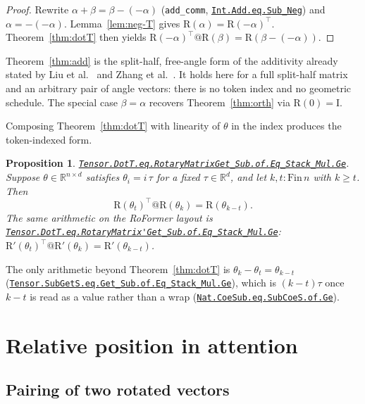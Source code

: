 \documentclass[11pt,a4paper]{article}
\newcommand{\lmod}[1]{\href{http://www.lemma.cn/lean/?module=#1}{\nolinkurl{#1}}}
\newtheorem{proposition}[theorem]{Proposition}
\newcommand{\R}{\mathbb{R}}
\newcommand{\rot}{\mathrm{R}}
\newcommand{\eye}{\mathrm{I}}
\begin{document}
\begin{proof}
Rewrite \(\alpha+\beta=\beta-(-\alpha)\)
(\texttt{add\_comm}, \lmod{Int.Add.eq.Sub_Neg})
and \(\alpha=-(-\alpha)\).
Lemma~\ref{lem:neg-T} gives \(\rot(\alpha)=\rot(-\alpha)^\top\).
Theorem~\ref{thm:dotT} then yields
\(\rot(-\alpha)^\top @ \rot(\beta)=\rot(\beta-(-\alpha))\).
\end{proof}

Theorem~\ref{thm:add} is the split-half, free-angle form of the additivity already stated by Liu et al.~\cite{liu2025rethinking} and Zhang et al.~\cite{zhang2025grape}.
It holds here for a full split-half matrix and an arbitrary pair of angle vectors: there is no token index and no geometric schedule.
The special case \(\beta=\alpha\) recovers Theorem~\ref{thm:orth} via \(\rot(0)=\eye\).

Composing Theorem~\ref{thm:dotT} with linearity of \(\theta\) in the index produces the token-indexed form.

\begin{proposition}
\label{prop:eqdott}
\lmod{Tensor.DotT.eq.RotaryMatrixGet_Sub.of.Eq_Stack_Mul.Ge}.
Suppose \(\theta\in\R^{n\times d}\) satisfies \(\theta_i=i\,\tau\) for a fixed \(\tau\in\R^d\), and let \(k,t:\mathrm{Fin}\,n\) with \(k\ge t\).
Then
\begin{equation}
  \rot(\theta_t)^\top @ \rot(\theta_k) = \rot(\theta_{k-t}).
\end{equation}
The same arithmetic on the RoFormer layout is
\lmod{Tensor.DotT.eq.RotaryMatrix'Get_Sub.of.Eq_Stack_Mul.Ge}:
\(\rot'(\theta_t)^\top @ \rot'(\theta_k) = \rot'(\theta_{k-t})\).
\end{proposition}

The only arithmetic beyond Theorem~\ref{thm:dotT} is
\(\theta_k-\theta_t=\theta_{k-t}\)
(\lmod{Tensor.SubGetS.eq.Get_Sub.of.Eq_Stack_Mul.Ge}),
which is \((k-t)\tau\) once \(k-t\) is read as a value rather than a wrap
(\lmod{Nat.CoeSub.eq.SubCoeS.of.Ge}).

\section{Relative position in attention}
\label{sec:rel}

\subsection{Pairing of two rotated vectors}
\label{sec:pair}
\end{document}
